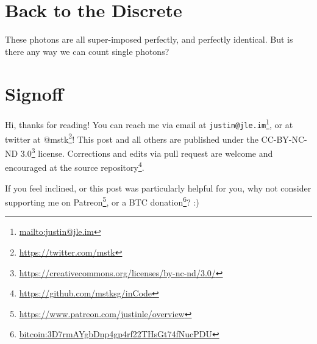\documentclass[]{article}
\renewcommand{\href}[2]{#2\footnote{\url{#1}}}
\begin{document}
\hypertarget{back-to-the-discrete}{%
\section{Back to the Discrete}\label{back-to-the-discrete}}

These photons are all super-imposed perfectly, and perfectly identical. But is
there any way we can count single photons?

\hypertarget{signoff}{%
\section{Signoff}\label{signoff}}

Hi, thanks for reading! You can reach me via email at
\href{mailto:justin@jle.im}{\nolinkurl{justin@jle.im}}, or at twitter at
\href{https://twitter.com/mstk}{@mstk}! This post and all others are published
under the \href{https://creativecommons.org/licenses/by-nc-nd/3.0/}{CC-BY-NC-ND
3.0} license. Corrections and edits via pull request are welcome and encouraged
at \href{https://github.com/mstksg/inCode}{the source repository}.

If you feel inclined, or this post was particularly helpful for you, why not
consider \href{https://www.patreon.com/justinle/overview}{supporting me on
Patreon}, or a \href{bitcoin:3D7rmAYgbDnp4gp4rf22THsGt74fNucPDU}{BTC donation}?
:)
\end{document}
